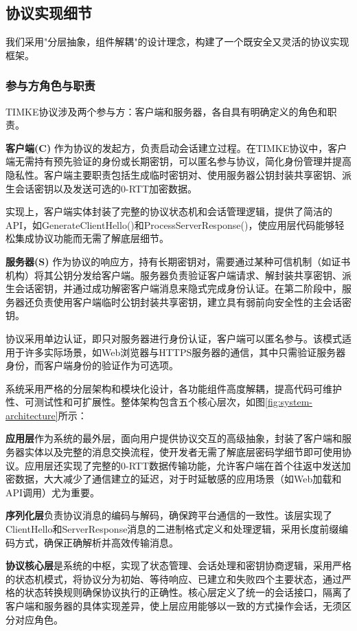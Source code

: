 \subsection{协议实现细节}
\label{subsec:implementation_details}

我们采用"分层抽象，组件解耦"的设计理念，构建了一个既安全又灵活的协议实现框架。

\subsubsection{参与方角色与职责}
TIMKE协议涉及两个参与方：客户端和服务器，各自具有明确定义的角色和职责。

\textbf{客户端(C)} 作为协议的发起方，负责启动会话建立过程。在TIMKE协议中，客户端无需持有预先验证的身份或长期密钥，可以匿名参与协议，简化身份管理并提高隐私性。客户端主要职责包括生成临时密钥对、使用服务器公钥封装共享密钥、派生会话密钥以及发送可选的0-RTT加密数据。

实现上，客户端实体封装了完整的协议状态机和会话管理逻辑，提供了简洁的API，如GenerateClientHello()和ProcessServerResponse()，使应用层代码能够轻松集成协议功能而无需了解底层细节。

\textbf{服务器(S)} 作为协议的响应方，持有长期密钥对，需要通过某种可信机制（如证书机构）将其公钥分发给客户端。服务器负责验证客户端请求、解封装共享密钥、派生会话密钥，并通过成功解密客户端消息来隐式完成身份认证。在第二阶段中，服务器还负责使用客户端临时公钥封装共享密钥，建立具有弱前向安全性的主会话密钥。

协议采用单边认证，即只对服务器进行身份认证，客户端可以匿名参与。该模式适用于许多实际场景，如Web浏览器与HTTPS服务器的通信，其中只需验证服务器身份，而客户端身份的验证作为可选项。

\label{subsubsec:system_architecture}
系统采用严格的分层架构和模块化设计，各功能组件高度解耦，提高代码可维护性、可测试性和可扩展性。整体架构包含五个核心层次，如图\ref{fig:system-architecture}所示：

\textbf{应用层}作为系统的最外层，面向用户提供协议交互的高级抽象，封装了客户端和服务器实体以及完整的消息交换流程，使开发者无需了解底层密码学细节即可使用协议。应用层还实现了完整的0-RTT数据传输功能，允许客户端在首个往返中发送加密数据，大大减少了通信建立的延迟，对于时延敏感的应用场景（如Web加载和API调用）尤为重要。

\textbf{序列化层}负责协议消息的编码与解码，确保跨平台通信的一致性。该层实现了ClientHello和ServerResponse消息的二进制格式定义和处理逻辑，采用长度前缀编码方式，确保正确解析并高效传输消息。

\textbf{协议核心层}是系统的中枢，实现了状态管理、会话处理和密钥协商逻辑，采用严格的状态机模式，将协议分为初始、等待响应、已建立和失败四个主要状态，通过严格的状态转换规则确保协议执行的正确性。核心层定义了统一的会话接口，隔离了客户端和服务器的具体实现差异，使上层应用能够以一致的方式操作会话，无须区分对应角色。

